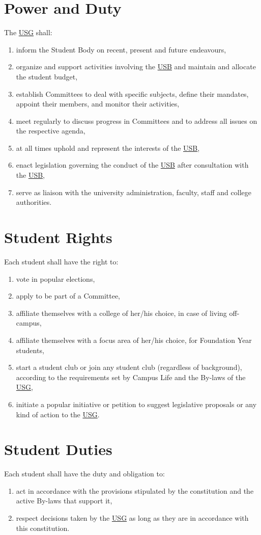 \section{Power and Duty}
The \hyperref[USGdef]{USG} shall: 
\begin{enumerate}
\item inform the Student Body on recent, present and future endeavours,
\item organize and support activities involving the \hyperref[studentbody]{USB} and maintain and allocate the student budget,
\item establish Committees to deal with specific subjects, define their mandates, appoint their members, and monitor their activities,
\item meet regularly to discuss progress in Committees and to address all issues on the respective agenda,
\item at all times uphold and represent the interests of the \hyperref[studentbody]{USB},
\item enact legislation governing the conduct of the \hyperref[studentbody]{USB} after consultation with the \hyperref[studentbody]{USB},
\item serve as liaison with the university administration, faculty, staff and college authorities.
\end{enumerate}

\section{Student Rights}
Each student shall have the right to:
\begin{enumerate}[nosep] 
\item vote in popular elections,
\item apply to be part of a Committee,
\item affiliate themselves with a college of her/his choice, in case of living off-campus,
\item affiliate themselves with a focus area of her/his choice, for Foundation Year students,
\item start a student club or join any student club (regardless of background), according to the requirements set by Campus Life and the By-laws of the \hyperref[USGdef]{USG},
\item initiate a popular initiative or petition to suggest legislative proposals or any kind of action to the \hyperref[USGdef]{USG}.
\end{enumerate}

\section{Student Duties}
Each student shall have the duty and obligation to:
\begin{enumerate}
\item act in accordance with the provisions stipulated by the constitution and the active By-laws that support it,
\item respect decisions taken by the \hyperref[USGdef]{USG} as long as they are in accordance with this constitution.
\end{enumerate}